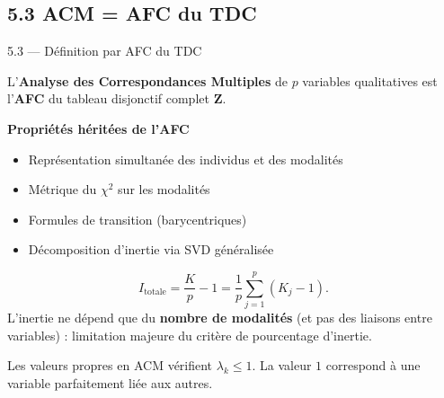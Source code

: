 \subsection{5.3 ACM = AFC du TDC}
\begin{frame}{5.3 — Définition par AFC du TDC}
\begin{definition}[ACM]
L'\textbf{Analyse des Correspondances Multiples} de $p$ variables qualitatives
est l'\textbf{AFC} du tableau disjonctif complet $\mathbf{Z}$.
\end{definition}

\textbf{Propriétés héritées de l'AFC}
\begin{itemize}
  \item Représentation \alert{simultanée} des individus et des modalités
  \item Métrique du $\chi^2$ sur les modalités
  \item Formules de transition (barycentriques)
  \item Décomposition d'inertie via SVD généralisée
\end{itemize}

\begin{theorem}
\[
I_{\text{totale}} = \frac{K}{p} - 1 = \frac{1}{p}\sum_{j=1}^p (K_j - 1).
\]
L'inertie ne dépend que du \textbf{nombre de modalités} (et pas des liaisons
entre variables) : limitation majeure du critère de pourcentage d'inertie.
\end{theorem}

\begin{rema}
\small Les valeurs propres en ACM vérifient $\lambda_k \leq 1$. La valeur $1$
correspond à une variable parfaitement liée aux autres.
\end{rema}
\end{frame}

